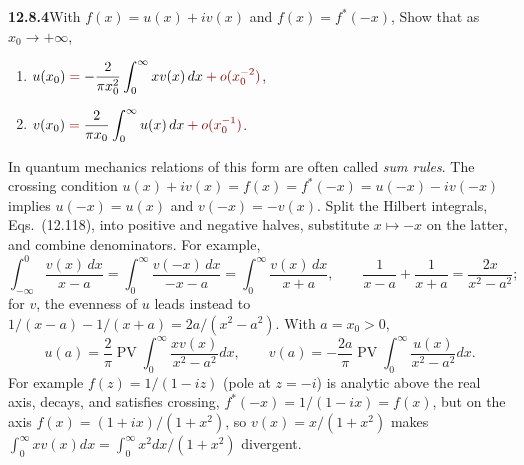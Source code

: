 \par\bigskip
\noindent\textbf{12.8.4}\quad With $f(x)=u(x)+iv(x)$ and $f(x)=f^{*}(-x)$,
 Show that as $x_0\to+\infty$,
\begin{enumerate}
\item[(a)] $u(x_{0})\mathrel{\erratum{=}}-\dfrac{2}{\pi x_{0}^{2}}
  \displaystyle\int_{0}^{\infty}xv(x)\,dx
  \mathbin{\erratum{+}}\erratum{o(x_0^{-2})}$,
\item[(b)] $v(x_{0})\mathrel{\erratum{=}}\dfrac{2}{\pi x_{0}}
  \displaystyle\int_{0}^{\infty}u(x)\,dx
  \mathbin{\erratum{+}}\erratum{o(x_0^{-1})}$.
\end{enumerate}
In quantum mechanics relations of this form are often called \emph{sum rules}.
\solution
The crossing condition $u(x)+iv(x)=f(x)=f^*(-x)=u(-x)-iv(-x)$ implies
$u(-x)=u(x)$ and $v(-x)=-v(x)$.
Split the Hilbert integrals, Eqs.~(12.118), into positive and negative
halves, substitute $x\mapsto-x$ on the latter, and combine
denominators. For example,
\[
\int_{-\infty}^0\frac{v(x)\,dx}{x-a}=\int_0^\infty\frac{v(-x)\,dx}{-x-a}
=\int_0^\infty\frac{v(x)\,dx}{x+a},\qquad
\frac1{x-a}+\frac1{x+a}=\frac{2x}{x^2-a^2};
\]
for $v$, the evenness of $u$ leads instead to
$1/(x-a)-1/(x+a)=2a/(x^2-a^2)$. With $a=x_0>0$,
\[
u(a)=\frac2\pi\operatorname{PV}\int_0^\infty
\frac{xv(x)}{x^2-a^2}dx,\qquad
v(a)=-\frac{2a}\pi\operatorname{PV}\int_0^\infty
\frac{u(x)}{x^2-a^2}dx.
\]
For example $f(z)=1/(1-iz)$ (pole at $z=-i$) is analytic above the
real axis, decays, and satisfies crossing,
$f^*(-x)=1/(1-ix)=f(x)$, but on the axis
$f(x)=(1+ix)/(1+x^2)$, so $v(x)=x/(1+x^2)$ makes
$\int_0^\infty xv(x)dx=\int_0^\infty x^2dx/(1+x^2)$ divergent.


